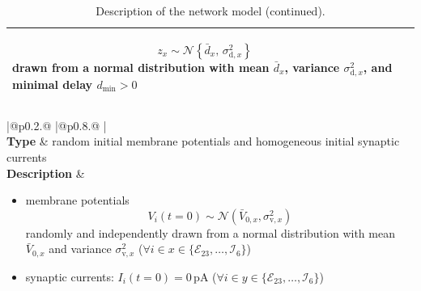 \documentclass[10pt,a4paper,twoside,american]{article}
\theoremstyle{definitionstyle}
\begin{document}
\begin{table}
\begin{tabular}{
  |@{\hspace*{\marg}}p{}@{\hspace*{\marg}}
  |@{\hspace*{\marg}}p{}@{\hspace*{\marg}}
  |}
\begin{itemize}
\begin{equation*}
      z_{x} \sim\mathcal{N}\left\{\bar{d}_{x},\,\sigma_{\text{d},x}^2\right\}
  \end{equation*}
  drawn from a normal distribution with mean $\bar{d}_{x}$, variance $\sigma_{\text{d},x}^2$, and minimal delay $d_\text{min} > 0$
  \end{itemize}\\
  \hline
\end{tabular}
\begin{tabular}{
  |@{\hspace*{\marg}}p{}@{\hspace*{\marg}}
  |@{\hspace*{\marg}}p{}@{\hspace*{\marg}}
  |}
  \hline
  \\
\hline
\textbf{Type} & random initial membrane potentials and homogeneous initial synaptic currents\\
\hline
  \textbf{Description} &
  \begin{itemize}
  \item membrane potentials
    \begin{equation*}
      V_i(t=0)\sim\mathcal{N}(\bar{V}_{0,x},\sigma_{\text{v},x}^2)
    \end{equation*}
  randomly and independently drawn from a normal distribution with mean $\bar{V}_{0,x}$ and variance $\sigma^2_{\text{v},x}$ ($\forall i \in x\in\{\mathcal{E}_{23},\ldots,\mathcal{I}_{6}\}$)
  \item synaptic currents: $I_{i}(t=0)=0\,\text{pA}$ ($\forall i \in y\in\{\mathcal{E}_{23},\ldots,\mathcal{I}_{6}\}$)
  \end{itemize}\\
  \hline
\end{tabular}
\caption{Description of the network model (continued).}
\end{table}
\clearpage
\end{document}
